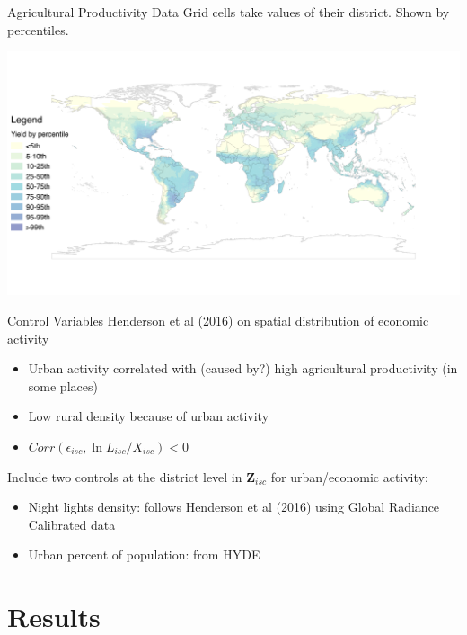 \documentclass[10pt, xcolor=dvipsnames]{beamer}
\begin{document}
\begin{frame}{Agricultural Productivity Data}
Grid cells take values of their district. Shown by percentiles.
\vspace{-.5in}
\begin{center}
\includegraphics[scale=.5]{fig_csi_yield_map.png}
\end{center}
\end{frame}

\begin{frame}{Control Variables}
Henderson et al (2016) on spatial distribution of economic activity
\begin{itemize}
  \item Urban activity correlated with (caused by?) high agricultural productivity (in some places)
  \item Low rural density because of urban activity
  \item $Corr(\epsilon_{isc},\ln L_{isc}/X_{isc})<0$
\end{itemize}

Include two controls at the district level in $\mathbf{Z}_{isc}$ for urban/economic activity:
\begin{itemize}
  \item Night lights density: follows Henderson et al (2016) using Global Radiance Calibrated data
  \item Urban percent of population: from HYDE
\end{itemize}

\end{frame}

\section{Results}
\end{document}
